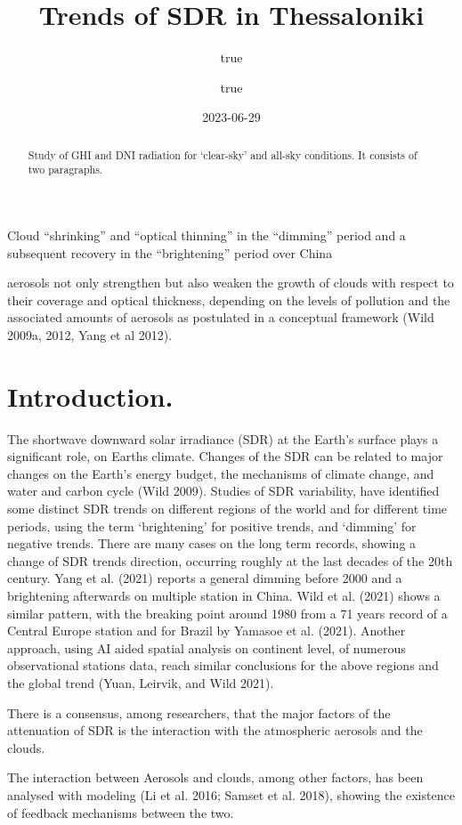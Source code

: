 \documentclass[
  preprint, 3p, authoryear]{article}
\title{Trends of SDR in Thessaloniki}
\author{true \and true}
\date{2023-06-29}
\begin{document}
\maketitle
\begin{abstract}
Study of GHI and DNI radiation for `clear-sky' and all-sky conditions.
It consists of two paragraphs.
\end{abstract}

Cloud ``shrinking'' and ``optical thinning'' in the ``dimming'' period and a subsequent recovery in the ``brightening'' period over China

aerosols not only strengthen but also weaken the
growth of clouds with respect to their coverage and
optical thickness, depending on the levels of pollution
and the associated amounts of aerosols as postulated
in a conceptual framework (Wild 2009a, 2012, Yang
et al 2012).

\hypertarget{introduction.}{%
\section{Introduction.}\label{introduction.}}

The shortwave downward solar irradiance (SDR) at the Earth's surface plays a significant role, on Earths climate.
Changes of the SDR can be related to major changes on the Earth's energy budget, the mechanisms of climate change, and water and carbon cycle (Wild 2009).
Studies of SDR variability, have identified some distinct SDR trends on different regions of the world and for different time periods, using the term `brightening' for positive trends, and `dimming' for negative trends.
There are many cases on the long term records, showing a change of SDR trends direction, occurring roughly at the last decades of the 20th century.
Yang et al. (2021) reports a general dimming before 2000 and a brightening afterwards on multiple station in China.
Wild et al. (2021) shows a similar pattern, with the breaking point around 1980 from a 71 years record of a Central Europe station and for Brazil by Yamasoe et al. (2021).
Another approach, using AI aided spatial analysis on continent level, of numerous observational stations data, reach similar conclusions for the above regions and the global trend (Yuan, Leirvik, and Wild 2021).

There is a consensus, among researchers, that the major factors of the attenuation of SDR is the interaction with the atmospheric aerosols and the clouds.

The interaction between Aerosols and clouds, among other factors, has been analysed with modeling (Li et al. 2016; Samset et al. 2018), showing the existence of feedback mechanisms between the two.
\end{document}
